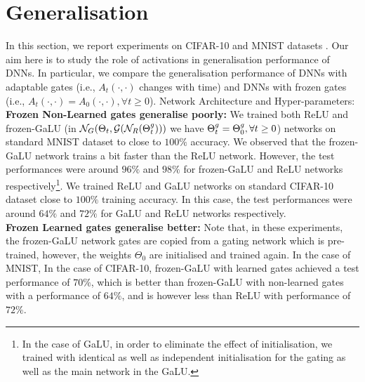 \section{Generalisation}\label{sec:generalisation}
In this section, we report experiments on CIFAR-10 and MNIST  datasets . Our aim here is to study the role of activations in generalisation performance of DNNs. In particular, we compare the generalisation performance of DNNs with adaptable gates (i.e., $A_t(\cdot,\cdot)$ changes with time) and DNNs with frozen gates (i.e., $A_t(\cdot,\cdot)=A_0(\cdot,\cdot),\forall t\geq 0$).
Network Architecture and Hyper-parameters:\hfill\\
\textbf{Frozen Non-Learned gates generalise poorly:} We trained both ReLU and frozen-GaLU (in $\mathcal{N}_G(\Theta_t,\mathcal{G}(\mathcal{N}_R({\Theta}^g_t)))$ we have ${\Theta}^g_t={\Theta}^g_0,\forall t\geq 0$) networks on standard MNIST dataset to close to $100\%$ accuracy. We observed that the frozen-GaLU network trains a bit faster than the ReLU network. However, the test performances were around $96\%$ and  $98\%$ for frozen-GaLU and ReLU networks respectively\footnote{In the case of GaLU, in order to eliminate the effect of initialisation, we trained with identical as well as independent initialisation for the gating as well as the main network in the GaLU. }. We trained ReLU and GaLU networks on standard CIFAR-10 dataset close to $100\%$ training accuracy. In this case, the test performances were around $64\%$ and $72\%$ for GaLU and ReLU networks respectively.\hfill\\
\textbf{Frozen Learned gates generalise better:} Note that, in these experiments, the frozen-GaLU network gates are copied from a gating network which is pre-trained, however, the weights $\Theta_0$ are initialised and trained again.  In the case of MNIST, 
In the case of CIFAR-10, frozen-GaLU with learned gates achieved a test performance of $70\%$, which is better than frozen-GaLU with non-learned gates with a performance of  $64\%$, and is however less than ReLU with performance of $72\%$. \hfill\\

